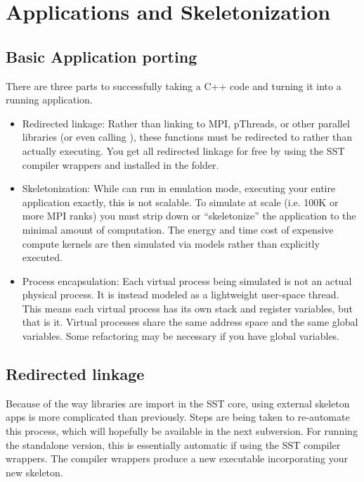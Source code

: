 
\chapter{Applications and Skeletonization}
\label{sec:skeletonization}

\section{Basic Application porting}
\label{sec:skel:basic}
There are three parts to successfully taking a C++ code and turning it into a running application.
\begin{itemize}
\item Redirected linkage: Rather than linking to MPI, pThreads, or other parallel libraries (or even calling ), these functions must be redirected to \sstmacro rather than actually executing.
You get all redirected linkage for free by using
the SST compiler wrappers  and  installed in the  folder.
\item Skeletonization: While \sstmacro can run in emulation mode, executing your entire application exactly, this is not scalable.  To simulate at scale (i.e. 100K or more MPI ranks) you must strip down or ``skeletonize'' the application to the minimal amount of computation.  The energy and time cost of expensive compute kernels are then simulated via models rather than explicitly executed. 

\item Process encapsulation: Each virtual process being simulated is not an actual physical process. It is instead modeled as a lightweight user-space thread.  This means each virtual process has its own stack and register variables, but that is it.
Virtual processes share the same address space and the same global variables.  Some refactoring may be necessary if you have global variables.

\end{itemize}

\section{Redirected linkage}
\label{sec:skel:linkage}
Because of the way libraries are import in the SST core, using external skeleton apps is more complicated than previously.  Steps are being taken to re-automate this process, which will hopefully be available in the next subversion. For running the standalone version, this is essentially automatic  if using the SST compiler wrappers.  The compiler wrappers produce a new executable incorporating your new skeleton.

